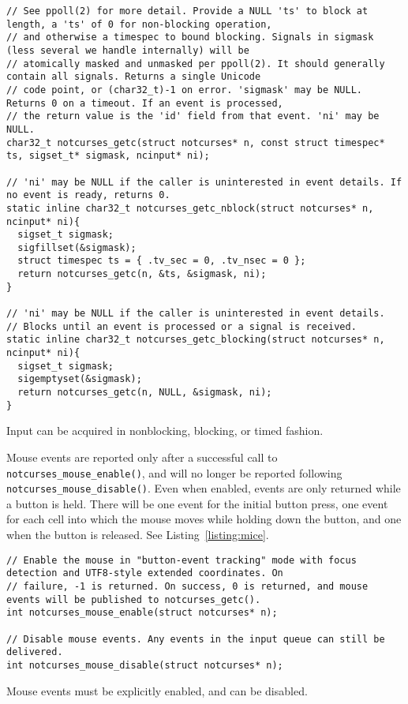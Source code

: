\begin{listing}[!htb]
\begin{verbatim}
// See ppoll(2) for more detail. Provide a NULL 'ts' to block at length, a 'ts' of 0 for non-blocking operation,
// and otherwise a timespec to bound blocking. Signals in sigmask (less several we handle internally) will be
// atomically masked and unmasked per ppoll(2). It should generally contain all signals. Returns a single Unicode
// code point, or (char32_t)-1 on error. 'sigmask' may be NULL. Returns 0 on a timeout. If an event is processed,
// the return value is the 'id' field from that event. 'ni' may be NULL.
char32_t notcurses_getc(struct notcurses* n, const struct timespec* ts, sigset_t* sigmask, ncinput* ni);

// 'ni' may be NULL if the caller is uninterested in event details. If no event is ready, returns 0.
static inline char32_t notcurses_getc_nblock(struct notcurses* n, ncinput* ni){
  sigset_t sigmask;
  sigfillset(&sigmask);
  struct timespec ts = { .tv_sec = 0, .tv_nsec = 0 };
  return notcurses_getc(n, &ts, &sigmask, ni);
}

// 'ni' may be NULL if the caller is uninterested in event details.
// Blocks until an event is processed or a signal is received.
static inline char32_t notcurses_getc_blocking(struct notcurses* n, ncinput* ni){
  sigset_t sigmask;
  sigemptyset(&sigmask);
  return notcurses_getc(n, NULL, &sigmask, ni);
}
\end{verbatim}
\caption{Input can be acquired in nonblocking, blocking, or timed fashion.}
\label{listing:input}
\end{listing}

Mouse events are reported only after a successful call to
\texttt{notcurses\_mouse\_enable()}, and will no longer be reported following
\texttt{notcurses\_mouse\_disable()}. Even when enabled, events are only
returned while a button is held. There will be one event for the initial button
press, one event for each cell into which the mouse moves while holding down
the button, and one when the button is released. See Listing~\ref{listing:mice}.

\begin{listing}[!htb]
\begin{verbatim}
// Enable the mouse in "button-event tracking" mode with focus detection and UTF8-style extended coordinates. On
// failure, -1 is returned. On success, 0 is returned, and mouse events will be published to notcurses_getc().
int notcurses_mouse_enable(struct notcurses* n);

// Disable mouse events. Any events in the input queue can still be delivered.
int notcurses_mouse_disable(struct notcurses* n);
\end{verbatim}
\caption{Mouse events must be explicitly enabled, and can be disabled.}
\label{listing:mice}
\end{listing}

